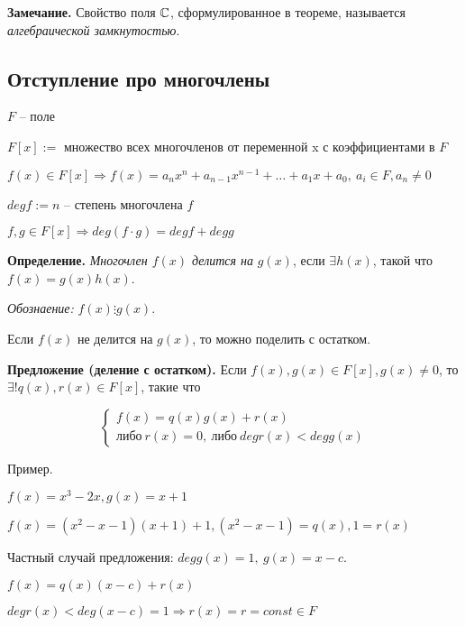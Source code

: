 \vspace{\baselineskip}
\textbf{Замечание.} Свойство поля $\mathbb{C}$, сформулированное в теореме, называется \textit{алгебраической замкнутостью}.

\subsection{Отступление про многочлены}

$F$ -- поле

$F[x] :=$ множество всех многочленов от переменной x с коэффициентами в $F$

$f(x) \in F[x] \Rightarrow f(x) = a_n x^n + a_{n-1} x^{n-1}+ \dots + a_1 x + a_0, \ a_i \in F, a_n \neq 0$

$deg f := n$ -- степень многочлена $f$

$f, g \in F[x] \Rightarrow deg(f \cdot g) = degf + deg g$

\vspace{\baselineskip}
\textbf{Определение.} \textit{Многочлен $f(x)$ делится на} $g(x)$, если $\exists h(x)$, такой что $f(x) = g(x) h(x)$.

\textit{Обознаение:} $f(x) \vdots g(x)$.

Если $f(x)$ не делится на $g(x)$, то можно поделить с остатком.

\vspace{\baselineskip}
\textbf{Предложение (деление с остатком).} Если $f(x), g(x) \in F[x], g(x) \neq 0$, то $\exists ! q(x), r(x) \in F[x]$, такие что

\begin{equation*}
	\left\{
		\begin{aligned}
			f(x) = q(x) g(x) + r(x)  \\
			либо \ r(x) = 0, \ либо \ degr(x) < degg(x) 
		\end{aligned}
	\right.
\end{equation*}

\vspace{\baselineskip}
Пример.

$f(x) = x^3 - 2x, g(x) = x + 1$

$f(x) = (x^2 - x - 1)(x + 1) + 1, (x^2 - x - 1) = q(x), 1 = r(x)$

\vspace{\baselineskip}
Частный случай предложения: $deg g(x) = 1, \ g(x) = x - c$.

$f(x) = q(x) (x - c) + r(x)$

$deg r(x) < deg (x - c) = 1 \Rightarrow r(x) = r = const \in F$

